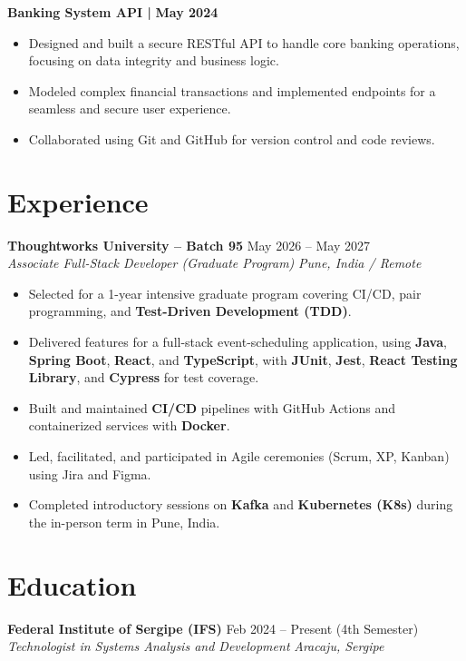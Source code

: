 \documentclass[a4paper,10pt]{article}
\newcommand{\entry}[4]{
    \noindent\textbf{#1} \hfill #2 \\
    \noindent\textit{#3} \hfill \textit{#4} \\
    \vspace{2pt}
}
\newcommand{\project}[2]{
    \noindent\textbf{#1} \hfill #2 \\
    \vspace{2pt}
}
\begin{document}
\project{Banking System API | \normalfont{\textit{Python, Django, REST Framework}}}{\textbf{May 2024}}
\vspace{-1.6em}
\begin{itemize}
\setlength\itemsep{-0.3em}
    \item Designed and built a secure RESTful API to handle core banking operations, focusing on data integrity and business logic.
    \item Modeled complex financial transactions and implemented endpoints for a seamless and secure user experience.
    \item Collaborated using Git and GitHub for version control and code reviews.
\end{itemize}


\section*{Experience}
\vspace{0.6em}
\entry{Thoughtworks University -- Batch 95}{\faCalendar \space May 2026 -- May 2027}{Associate Full-Stack Developer (Graduate Program)}{\faMapMarker \space Pune, India / Remote}
\vspace{-1.6em}
\begin{itemize}
\setlength\itemsep{-0.3em}
    \item Selected for a 1-year intensive graduate program covering CI/CD, pair programming, and \textbf{Test-Driven Development (TDD)}.
    \item Delivered features for a full-stack event-scheduling application, using \textbf{Java}, \textbf{Spring Boot}, \textbf{React}, and \textbf{TypeScript}, with \textbf{JUnit}, \textbf{Jest}, \textbf{React Testing Library}, and \textbf{Cypress} for test coverage.
    \item Built and maintained \textbf{CI/CD} pipelines with GitHub Actions and containerized services with \textbf{Docker}.
    \item Led, facilitated, and participated in Agile ceremonies (Scrum, XP, Kanban) using Jira and Figma.
    \item Completed introductory sessions on \textbf{Kafka} and \textbf{Kubernetes (K8s)} during the in-person term in Pune, India.
\end{itemize}

\section*{Education}
\vspace{0.6em}
\entry{Federal Institute of Sergipe (IFS)}{\faCalendar \space Feb 2024 -- Present (4th Semester)}{Technologist in Systems Analysis and Development}{\faMapMarker \space Aracaju, Sergipe}
\end{document}
